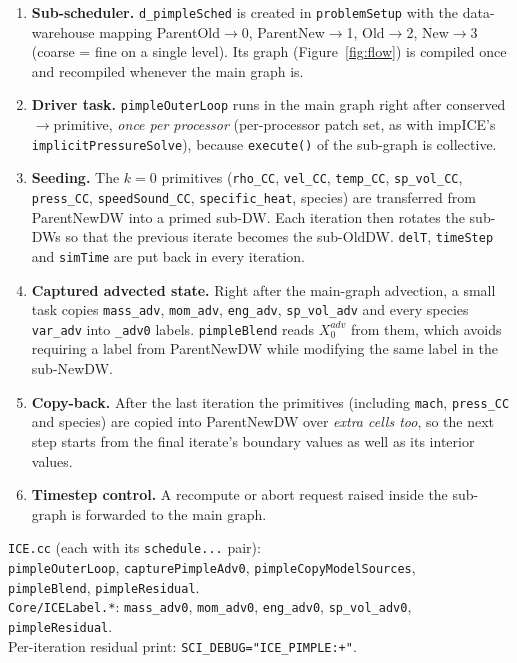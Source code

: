 \documentclass[11pt]{article}
\newcommand{\code}[1]{\texttt{\small #1}}
\newcommand{\file}[1]{\texttt{\small\color{Moss}#1}}
\begin{document}
\begin{enumerate}[leftmargin=*]
  \item \textbf{Sub-scheduler.} \code{d\_pimpleSched} is created in \code{problemSetup} with the
        data-warehouse mapping ParentOld$\to$0, ParentNew$\to$1, Old$\to$2, New$\to$3 (coarse = fine
        on a single level). Its graph (Figure~\ref{fig:flow}) is compiled once and recompiled
        whenever the main graph is.
  \item \textbf{Driver task.} \code{pimpleOuterLoop} runs in the main graph right after
        conserved$\to$primitive, \emph{once per processor} (per-processor patch set, as with
        impICE's \code{implicitPressureSolve}), because \code{execute()} of the sub-graph is
        collective.
  \item \textbf{Seeding.} The $k=0$ primitives (\code{rho\_CC}, \code{vel\_CC}, \code{temp\_CC},
        \code{sp\_vol\_CC}, \code{press\_CC}, \code{speedSound\_CC}, \code{specific\_heat}, species)
        are transferred from ParentNewDW into a primed sub-DW. Each iteration then rotates the
        sub-DWs so that the previous iterate becomes the sub-OldDW. \code{delT},
        \code{timeStep} and \code{simTime} are put back in every iteration.
  \item \textbf{Captured advected state.} Right after the main-graph advection, a small task
        copies \code{mass\_adv}, \code{mom\_adv}, \code{eng\_adv}, \code{sp\_vol\_adv} and every
        species \code{var\_adv} into \code{*\_adv0} labels. \code{pimpleBlend} reads $X^{adv}_0$ from
        them, which avoids requiring a label from ParentNewDW while modifying the same label in
        the sub-NewDW.
  \item \textbf{Copy-back.} After the last iteration the primitives (including \code{mach},
        \code{press\_CC} and species) are copied into ParentNewDW over \emph{extra cells too},
        so the next step starts from the final iterate's boundary values as well as its
        interior values.
  \item \textbf{Timestep control.} A recompute or abort request raised inside the sub-graph is
        forwarded to the main graph.
\end{enumerate}

\begin{incode}
\file{ICE.cc} (each with its \code{schedule...} pair):\\
\hspace*{1em}\code{pimpleOuterLoop}, \code{capturePimpleAdv0}, \code{pimpleCopyModelSources},\\
\hspace*{1em}\code{pimpleBlend}, \code{pimpleResidual}.\\
\file{Core/ICELabel.*}: \code{mass\_adv0}, \code{mom\_adv0}, \code{eng\_adv0}, \code{sp\_vol\_adv0},
\code{pimpleResidual}.\\
Per-iteration residual print: \code{SCI\_DEBUG="ICE\_PIMPLE:+"}.
\end{incode}
\end{document}
